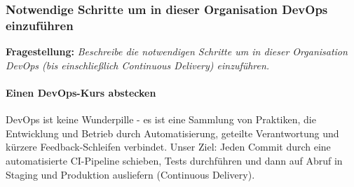 \subsubsection{Notwendige Schritte um in dieser Organisation DevOps einzuführen}
\textbf{Fragestellung:} \textit{Beschreibe die notwendigen Schritte um in dieser Organisation DevOps (bis einschließlich
Continuous Delivery) einzuführen.}
\paragraph{Einen DevOps-Kurs abstecken}
DevOps ist keine Wunderpille - es ist eine Sammlung von Praktiken, die Entwicklung und Betrieb durch Automatisierung, geteilte Verantwortung und kürzere Feedback-Schleifen verbindet. 
Unser Ziel: Jeden Commit durch eine automatisierte CI-Pipeline schieben, Tests durchführen und dann auf Abruf in Staging und Produktion ausliefern (Continuous Delivery).


